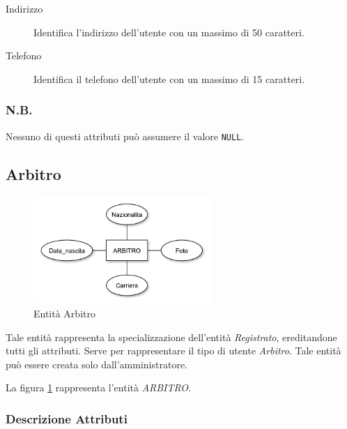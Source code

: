 		\begin{description}
			
			\item[Indirizzo]
			Identifica l'indirizzo dell'utente con un massimo di 50 caratteri.
			
			\item[Telefono]
			Identifica il telefono dell'utente con un massimo di 15 caratteri.
			
		\end{description}
		
		\subsubsection*{N.B.}
		Nessuno di questi attributi può assumere il valore \texttt{NULL}.
	
	\subsection{Arbitro}
		
		\begin{figure}[h]
			\centering
			\includegraphics[width=0.6\textwidth]
			{immagini/04-arbitro}
			
			\caption{Entità Arbitro}
			\label{entita-arbitro}
		\end{figure}
		
		Tale entità rappresenta la specializzazione dell'entità \emph{Registrato}, ereditandone tutti gli attributi. Serve per rappresentare il tipo di utente \emph{Arbitro}. Tale entità può essere creata solo dall'amministratore.
		
		La figura \ref{entita-arbitro} rappresenta l'entità \emph{ARBITRO}.
		
		\subsubsection*{Descrizione Attributi}
		
